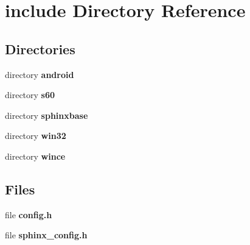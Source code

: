 \section{include Directory Reference}
\label{dir_d44c64559bbebec7f509842c48db8b23}
\subsection*{Directories}
\begin{DoxyCompactItemize}
\item 
directory {\bf android}
\item 
directory {\bf s60}
\item 
directory {\bf sphinxbase}
\item 
directory {\bf win32}
\item 
directory {\bf wince}
\end{DoxyCompactItemize}
\subsection*{Files}
\begin{DoxyCompactItemize}
\item 
file {\bfseries config.\-h}
\item 
file {\bfseries sphinx\-\_\-config.\-h}
\end{DoxyCompactItemize}
